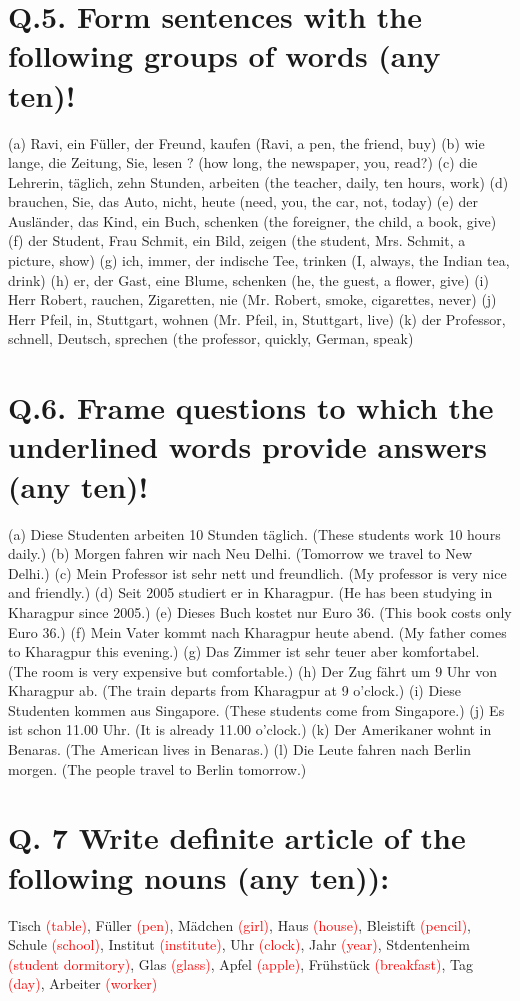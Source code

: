 \documentclass{article}
\begin{document}
\section*{Q.5. Form sentences with the following groups of words (any ten)!}
(a) Ravi, ein Füller, der Freund, kaufen (Ravi, a pen, the friend, buy)
(b) wie lange, die Zeitung, Sie, lesen ? (how long, the newspaper, you, read?)
(c) die Lehrerin, täglich, zehn Stunden, arbeiten (the teacher, daily, ten hours, work)
(d) brauchen, Sie, das Auto, nicht, heute (need, you, the car, not, today)
(e) der Ausländer, das Kind, ein Buch, schenken (the foreigner, the child, a book, give)
(f) der Student, Frau Schmit, ein Bild, zeigen (the student, Mrs. Schmit, a picture, show)
(g) ich, immer, der indische Tee, trinken (I, always, the Indian tea, drink)
(h) er, der Gast, eine Blume, schenken (he, the guest, a flower, give)
(i) Herr Robert, rauchen, Zigaretten, nie (Mr. Robert, smoke, cigarettes, never)
(j) Herr Pfeil, in, Stuttgart, wohnen (Mr. Pfeil, in, Stuttgart, live)
(k) der Professor, schnell, Deutsch, sprechen (the professor, quickly, German, speak)

\section*{Q.6. Frame questions to which the underlined words provide answers (any ten)!}
(a) Diese Studenten arbeiten 10 Stunden täglich. (These students work 10 hours daily.)
(b) Morgen fahren wir nach Neu Delhi. (Tomorrow we travel to New Delhi.)
(c) Mein Professor ist sehr nett und freundlich. (My professor is very nice and friendly.)
(d) Seit 2005 studiert er in Kharagpur. (He has been studying in Kharagpur since 2005.)
(e) Dieses Buch kostet nur Euro 36. (This book costs only Euro 36.)
(f) Mein Vater kommt nach Kharagpur heute abend. (My father comes to Kharagpur this evening.)
(g) Das Zimmer ist sehr teuer aber komfortabel. (The room is very expensive but comfortable.)
(h) Der Zug fährt um 9 Uhr von Kharagpur ab. (The train departs from Kharagpur at 9 o'clock.)
(i) Diese Studenten kommen aus Singapore. (These students come from Singapore.)
(j) Es ist schon 11.00 Uhr. (It is already 11.00 o'clock.)
(k) Der Amerikaner wohnt in Benaras. (The American lives in Benaras.)
(l) Die Leute fahren nach Berlin morgen. (The people travel to Berlin tomorrow.)

\section*{Q. 7 Write definite article of the following nouns (any ten)):}

Tisch \textcolor{red}{(table)}, Füller \textcolor{red}{(pen)}, Mädchen \textcolor{red}{(girl)}, Haus \textcolor{red}{(house)}, Bleistift \textcolor{red}{(pencil)}, Schule \textcolor{red}{(school)}, Institut \textcolor{red}{(institute)}, Uhr \textcolor{red}{(clock)}, Jahr \textcolor{red}{(year)}, Stdentenheim \textcolor{red}{(student dormitory)}, Glas \textcolor{red}{(glass)}, Apfel \textcolor{red}{(apple)}, Frühstück \textcolor{red}{(breakfast)}, Tag \textcolor{red}{(day)}, Arbeiter \textcolor{red}{(worker)}
\end{document}
